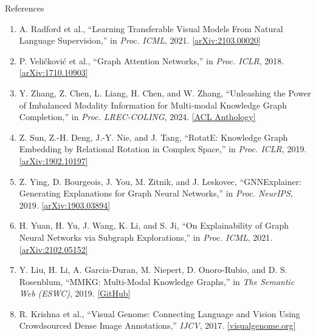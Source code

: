 \documentclass[aspectratio=169,10pt]{beamer}
\begin{document}
\begin{frame}{References}
  \footnotesize
  \begin{enumerate}
    \setlength{\itemsep}{3.5pt}
    \item A. Radford et al., ``Learning Transferable Visual Models From Natural Language Supervision,'' in \textit{Proc. ICML}, 2021. \href{https://arxiv.org/abs/2103.00020}{\color{HCMUSBlue}[arXiv:2103.00020]}
    \item P. Veli\v{c}kovi\'{c} et al., ``Graph Attention Networks,'' in \textit{Proc. ICLR}, 2018. \href{https://arxiv.org/abs/1710.10903}{\color{HCMUSBlue}[arXiv:1710.10903]}
    \item Y. Zhang, Z. Chen, L. Liang, H. Chen, and W. Zhang, ``Unleashing the Power of Imbalanced Modality Information for Multi-modal Knowledge Graph Completion,'' in \textit{Proc. LREC-COLING}, 2024. \href{https://aclanthology.org/2024.lrec-main.1487/}{\color{HCMUSBlue}[ACL Anthology]}
    \item Z. Sun, Z.-H. Deng, J.-Y. Nie, and J. Tang, ``RotatE: Knowledge Graph Embedding by Relational Rotation in Complex Space,'' in \textit{Proc. ICLR}, 2019. \href{https://arxiv.org/abs/1902.10197}{\color{HCMUSBlue}[arXiv:1902.10197]}
    \item Z. Ying, D. Bourgeois, J. You, M. Zitnik, and J. Leskovec, ``GNNExplainer: Generating Explanations for Graph Neural Networks,'' in \textit{Proc. NeurIPS}, 2019. \href{https://arxiv.org/abs/1903.03894}{\color{HCMUSBlue}[arXiv:1903.03894]}
    \item H. Yuan, H. Yu, J. Wang, K. Li, and S. Ji, ``On Explainability of Graph Neural Networks via Subgraph Explorations,'' in \textit{Proc. ICML}, 2021. \href{https://arxiv.org/abs/2102.05152}{\color{HCMUSBlue}[arXiv:2102.05152]}
    \item Y. Liu, H. Li, A. Garcia-Duran, M. Niepert, D. Onoro-Rubio, and D. S. Rosenblum, ``MMKG: Multi-Modal Knowledge Graphs,'' in \textit{The Semantic Web (ESWC)}, 2019. \href{https://github.com/nle-ml/mmkg}{\color{HCMUSBlue}[GitHub]}
    \item R. Krishna et al., ``Visual Genome: Connecting Language and Vision Using Crowdsourced Dense Image Annotations,'' \textit{IJCV}, 2017. \href{https://visualgenome.org/}{\color{HCMUSBlue}[visualgenome.org]}
  \end{enumerate}
\end{frame}

\appendix
\end{document}
